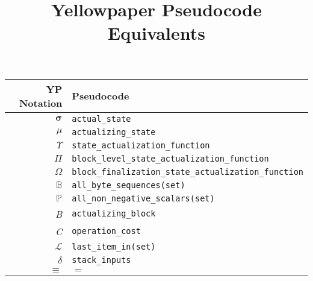 \documentclass[9pt,a4paper,oneside]{scrartcl}
\author{}
\title{Yellowpaper Pseudocode Equivalents}
\date{}
\begin{document}
\maketitle
\centering
\begin{tabular}{rl}
	\hline
	\textbf{YP Notation} & \textbf{Pseudocode} \\
	\hline
	$\boldsymbol{\sigma}$ & \texttt{actual\_state} \\
	$\mu$ & \texttt{actualizing\_state} \\
	$\Upsilon$ & \texttt{state\_actualization\_function} \\
	$\Pi$ & \texttt{block\_level\_state\_actualization\_function} \\
	$\Omega$ & \texttt{block\_finalization\_state\_actualization\_function} \\
	$\mathbb{B}$ & \texttt{all\_byte\_sequences(set)} \\
	$\mathbb{P}$ & \texttt{all\_non\_negative\_scalars(set)} \\
	\textit{B} & \texttt{actualizing\_block} \\
	\textit{C} & \texttt{operation\_cost} \\
	$\mathcal{L}$ & \texttt{last\_item\_in(set)} \\
	$\delta$ & \texttt{stack\_inputs} \\
	$\equiv$ & $=$ \\

	\hline
\end{tabular}


\printbibliography
\end{document}
